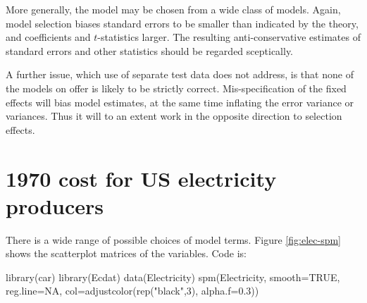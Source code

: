 \documentclass{tufte-book}\usepackage[]{graphicx}\usepackage[]{color}
\begin{document}
More generally, 
the model may be chosen from a wide class of models.
Again, model selection biases standard errors to be smaller than
indicated by the theory, and coefficients and $t$-statistics larger.
The resulting anti-conservative estimates of standard errors and
other statistics should be regarded
sceptically. 

A further issue, which use of separate test data does not
  address, is that none of the models on offer is likely to be
  strictly correct. Mis-specification of the fixed effects will bias
  model estimates, at the same time inflating the error variance or
  variances.  Thus it will to an extent work in the opposite direction
  to selection effects.

\section{1970 cost for US electricity producers}\label{ss:elec}

There is a wide range of possible choices of model terms.
Figure \ref{fig:elec-spm} shows the scatterplot matrices of the
variables. Code is:
\begin{Schunk}
\begin{Sinput}
library(car)
library(Ecdat)
data(Electricity)
spm(Electricity, smooth=TRUE, reg.line=NA,
    col=adjustcolor(rep("black",3), alpha.f=0.3))
\end{Sinput}
\end{Schunk}
\end{document}
